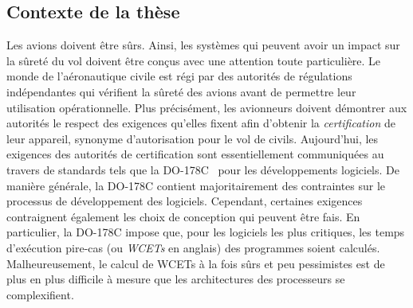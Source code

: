 \documentclass[main.tex]{subfiles}
\begin{document}
\subsection{Contexte de la thèse}
Les avions doivent être sûrs. Ainsi, les systèmes qui peuvent avoir un impact sur la sûreté du vol doivent être conçus avec une attention toute particulière. Le monde de l'aéronautique civile est régi par des autorités de régulations indépendantes qui vérifient la sûreté des avions avant de permettre leur utilisation opérationnelle. Plus précisément, les avionneurs doivent démontrer aux autorités le respect des exigences qu'elles fixent afin d'obtenir la \emph{certification} de leur appareil, synonyme d'autorisation pour le vol de civils. Aujourd'hui, les exigences des autorités de certification sont essentiellement communiquées au travers de standards tels que la DO-178C~\cite{do178} pour les développements logiciels. De manière générale, la DO-178C contient majoritairement des contraintes sur le processus de développement des logiciels. Cependant, certaines exigences contraignent également les choix de conception qui peuvent être fais. En particulier, la DO-178C impose que, pour les logiciels les plus critiques, les temps d'exécution pire-cas (ou \emph{WCETs} en anglais) des programmes soient calculés. Malheureusement, le calcul de WCETs à la fois sûrs et peu pessimistes est de plus en plus difficile à mesure que les architectures des processeurs se complexifient.
\end{document}

